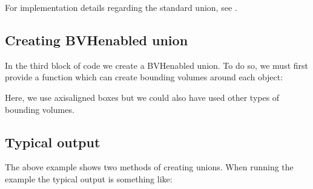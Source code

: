 \documentclass[letterpaper,10pt,english]{sphinxmanual}
\begin{document}
\begin{sphinxVerbatim}[commandchars=\\\{\}]
               
\end{sphinxVerbatim}

\sphinxAtStartPar
For implementation details regarding the standard union, see {\hyperref[\detokenize{ImplemUnion:chap-union}]{}}.


\subsection{Creating BVH\sphinxhyphen{}enabled union}
\label{\detokenize{Example_Union:creating-bvh-enabled-union}}
\sphinxAtStartPar
In the third block of code we create a BVH\sphinxhyphen{}enabled union.
To do so, we must first provide a function which can create bounding volumes around each object:

\begin{sphinxVerbatim}[commandchars=\\\{\}]
                      

           

          

\end{sphinxVerbatim}

\sphinxAtStartPar
Here, we use axis\sphinxhyphen{}aligned boxes but we could also have used other types of bounding volumes.


\subsection{Typical output}
\label{\detokenize{Example_Union:typical-output}}
\sphinxAtStartPar
The above example shows two methods of creating unions.
When running the example the typical output is something like:
\end{document}
